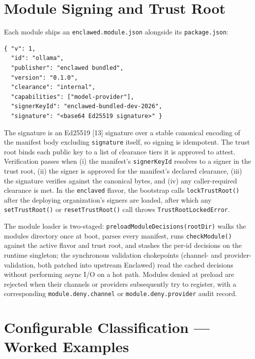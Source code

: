 \documentclass[11pt]{article}
\begin{document}
\section{Module Signing and Trust Root}
\label{sec:trust}

Each module ships an \texttt{enclawed.module.json} alongside its
\texttt{package.json}:

\begin{verbatim}
{ "v": 1,
  "id": "ollama",
  "publisher": "enclawed bundled",
  "version": "0.1.0",
  "clearance": "internal",
  "capabilities": ["model-provider"],
  "signerKeyId": "enclawed-bundled-dev-2026",
  "signature": "<base64 Ed25519 signature>" }
\end{verbatim}

The signature is an Ed25519 [13] signature over a stable canonical
encoding of the manifest body excluding \texttt{signature} itself, so
signing is idempotent. The trust root binds each public key to a list
of clearance tiers it is approved to attest. Verification passes when
(i) the manifest's \texttt{signerKeyId} resolves to a signer in the
trust root, (ii) the signer is approved for the manifest's declared
clearance, (iii) the signature verifies against the canonical bytes,
and (iv) any caller-required clearance is met. In the \texttt{enclaved}
flavor, the bootstrap calls \texttt{lockTrustRoot()} after the
deploying organization's signers are loaded, after which any
\texttt{setTrustRoot()} or \texttt{resetTrustRoot()} call throws
\texttt{TrustRootLockedError}.

The module loader is two-staged:
\texttt{preloadModuleDecisions(rootDir)} walks the modules directory
once at boot, parses every manifest, runs \texttt{checkModule()}
against the active flavor and trust root, and stashes the per-id
decisions on the runtime singleton; the synchronous validation
chokepoints (channel- and provider-validation, both patched into
upstream Enclawed) read the cached decisions without performing async
I/O on a hot path. Modules denied at preload are rejected when their
channels or providers subsequently try to register, with a
corresponding \texttt{module.deny.channel} or
\texttt{module.deny.provider} audit record.

\section{Configurable Classification --- Worked Examples}
\end{document}
